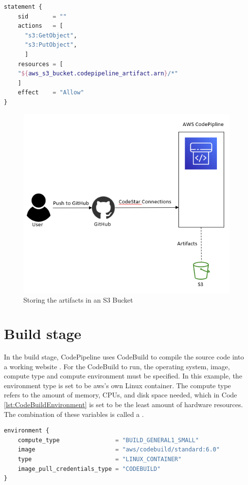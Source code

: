 \vspace{4mm}
\begin{lstlisting}[language=terraform, caption=Permissions to CodePipeline, captionpos=b, frame=single, label=lst:grantaccess]
statement {
    sid       = ""
    actions   = [
      "s3:GetObject",
      "s3:PutObject",
      ]
    resources = [
    "${aws_s3_bucket.codepipeline_artifact.arn}/*"
    ]
    effect    = "Allow"
}
\end{lstlisting}

\vspace{2mm}
\begin{figure}[H]
    \centering
    \includegraphics[width=0.6\columnwidth]{Images/aws-piplin-2.png}
    \caption{Storing the artifacts in an S3 Bucket}
    \label{fig: Storing the artifacts in an S3 Bucket}
\end{figure}

\section{Build stage}
In the build stage, CodePipeline uses CodeBuild to compile the source code into a working website \cite{CodeBuildProcess}. For the CodeBuild to run, the operating system, image, compute type and compute environment must be specified. In this example, the environment type is set to be \acrshort{aws}'s own Linux container. The compute type refers to the amount of memory, CPUs, and disk space needed, which in Code \ref{lst:CodeBuildEnvironment} is set to be the least amount of hardware resources. The combination of these variables is called a .

\vspace{2mm}
\begin{lstlisting}[language=terraform, caption=Creation of a build environment, captionpos=b, frame=single, label=lst:CodeBuildEnvironment]
environment {
    compute_type                = "BUILD_GENERAL1_SMALL"
    image                       = "aws/codebuild/standard:6.0"
    type                        = "LINUX_CONTAINER"
    image_pull_credentials_type = "CODEBUILD"
}
\end{lstlisting}

